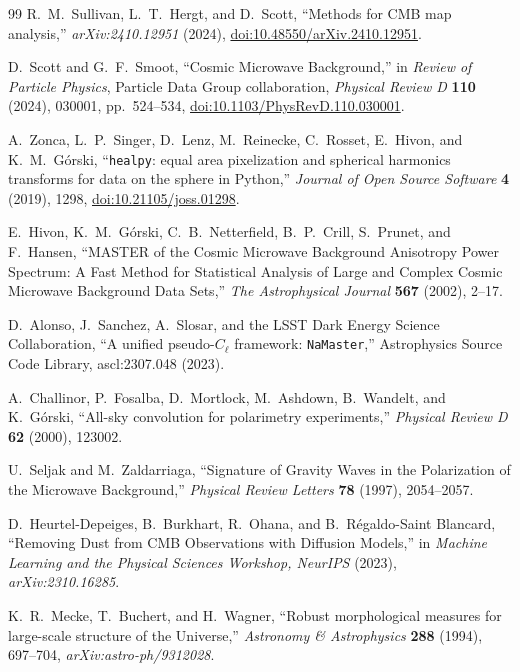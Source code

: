 \documentclass[11pt]{article}
\theoremstyle{definition}
\begin{document}
\begin{thebibliography}{99}
R.~M.~Sullivan, L.~T.~Hergt, and D.~Scott,
``Methods for CMB map analysis,''
\emph{arXiv:2410.12951} (2024), \href{https://doi.org/10.48550/arXiv.2410.12951}{doi:10.48550/arXiv.2410.12951}.

D.~Scott and G.~F.~Smoot,
``Cosmic Microwave Background,''
in \emph{Review of Particle Physics}, Particle Data Group collaboration,
\emph{Physical Review D} \textbf{110} (2024), 030001, pp.~524--534,
\href{https://doi.org/10.1103/PhysRevD.110.030001}{doi:10.1103/PhysRevD.110.030001}.

A.~Zonca, L.~P.~Singer, D.~Lenz, M.~Reinecke, C.~Rosset, E.~Hivon, and K.~M.~G\'orski,
``\texttt{healpy}: equal area pixelization and spherical harmonics transforms for data on the sphere in Python,''
\emph{Journal of Open Source Software} \textbf{4} (2019), 1298,
\href{https://doi.org/10.21105/joss.01298}{doi:10.21105/joss.01298}.

E.~Hivon, K.~M.~G\'orski, C.~B.~Netterfield, B.~P.~Crill, S.~Prunet, and F.~Hansen,
``MASTER of the Cosmic Microwave Background Anisotropy Power Spectrum: A Fast Method for Statistical Analysis of Large and Complex Cosmic Microwave Background Data Sets,''
\emph{The Astrophysical Journal} \textbf{567} (2002), 2--17.

D.~Alonso, J.~Sanchez, A.~Slosar, and the LSST Dark Energy Science Collaboration,
``A unified pseudo-$C_\ell$ framework: \texttt{NaMaster},''
Astrophysics Source Code Library, ascl:2307.048 (2023).

A.~Challinor, P.~Fosalba, D.~Mortlock, M.~Ashdown, B.~Wandelt, and K.~G\'orski,
``All-sky convolution for polarimetry experiments,''
\emph{Physical Review D} \textbf{62} (2000), 123002.

U.~Seljak and M.~Zaldarriaga,
``Signature of Gravity Waves in the Polarization of the Microwave Background,''
\emph{Physical Review Letters} \textbf{78} (1997), 2054--2057.

D.~Heurtel-Depeiges, B.~Burkhart, R.~Ohana, and B.~R\'egaldo-Saint Blancard,
``Removing Dust from CMB Observations with Diffusion Models,''
in \emph{Machine Learning and the Physical Sciences Workshop, NeurIPS} (2023),
\emph{arXiv:2310.16285}.

K.~R.~Mecke, T.~Buchert, and H.~Wagner,
``Robust morphological measures for large-scale structure of the Universe,''
\emph{Astronomy \& Astrophysics} \textbf{288} (1994), 697--704,
\emph{arXiv:astro-ph/9312028}.


\end{thebibliography}
\end{document}
